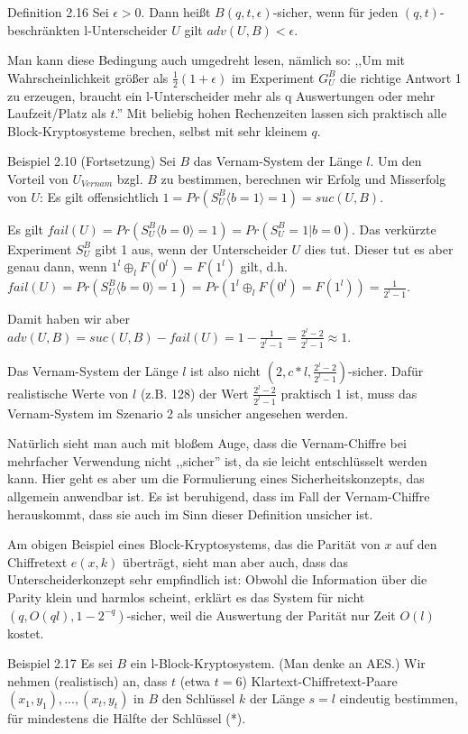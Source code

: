 \documentclass[a4paper]{article}
\begin{document}
\begin{multicols}{3}
    Definition 2.16 Sei $\epsilon>0$. Dann heißt $B(q,t,\epsilon)$-sicher, wenn für jeden $(q,t)$-beschränkten l-Unterscheider $U$ gilt $adv(U,B)< \epsilon$.

    Man kann diese Bedingung auch umgedreht lesen, nämlich so: ,,Um mit Wahrscheinlichkeit größer als $\frac{1}{2}(1 +\epsilon)$ im Experiment $G^B_U$ die richtige Antwort 1 zu erzeugen, braucht ein l-Unterscheider mehr als q Auswertungen oder mehr Laufzeit/Platz als $t$.''  Mit beliebig hohen Rechenzeiten lassen sich praktisch alle Block-Kryptosysteme brechen, selbst mit sehr kleinem $q$.

    Beispiel 2.10 (Fortsetzung) Sei $B$ das Vernam-System der Länge $l$. Um den Vorteil von $U_{Vernam}$ bzgl. $B$ zu bestimmen, berechnen wir Erfolg und Misserfolg von $U$: Es gilt offensichtlich $1=Pr(S^B_U\langle b= 1\rangle = 1) = suc(U,B)$.

    Es gilt $fail(U) = Pr(S^B_U\langle b= 0\rangle = 1) = Pr(S_U^B= 1|b= 0)$. Das verkürzte Experiment $S_U^B$ gibt 1 aus, wenn der Unterscheider $U$ dies tut. Dieser tut es aber genau dann, wenn $1^l\oplus_l F(0^l) =F(1^l)$ gilt, d.h. $fail(U) = Pr(S_U^B\langle b= 0\rangle = 1) = Pr(1^l\oplus_l F(0^l) =F(1^l)) = \frac{1}{2^l- 1}$.

    Damit haben wir aber $adv(U,B) = suc(U,B)-fail(U) = 1-\frac{1}{2^l- 1}=\frac{2^l-2}{2^l-1}\approx 1$.

    Das Vernam-System der Länge $l$ ist also nicht $(2,c*l,\frac{2^l- 2}{2^l- 1})$-sicher. Dafür realistische Werte von $l$ (z.B. 128) der Wert $\frac{2^l-2}{2^l-1}$ praktisch 1 ist, muss das Vernam-System im Szenario 2 als unsicher angesehen werden.

    Natürlich sieht man auch mit bloßem Auge, dass die Vernam-Chiffre bei mehrfacher Verwendung nicht ,,sicher'' ist, da sie leicht entschlüsselt werden kann. Hier geht es aber um die Formulierung eines Sicherheitskonzepts, das allgemein anwendbar ist. Es ist beruhigend, dass im Fall der Vernam-Chiffre herauskommt, dass sie auch im Sinn dieser Definition unsicher ist.

    Am obigen Beispiel eines Block-Kryptosystems, das die Parität von $x$ auf den Chiffretext $e(x,k)$ überträgt, sieht man aber auch, dass das Unterscheiderkonzept sehr empfindlich ist: Obwohl die Information über die Parity klein und harmlos scheint, erklärt es das System für nicht $(q,O(ql), 1-2^{-q})$-sicher, weil die Auswertung der Parität nur Zeit $O(l)$ kostet.

    Beispiel 2.17 Es sei $B$ ein l-Block-Kryptosystem. (Man denke an AES.) Wir nehmen (realistisch) an, dass $t$ (etwa $t=6$) Klartext-Chiffretext-Paare $(x_1,y_1),...,(x_t,y_t)$ in $B$ den Schlüssel $k$ der Länge $s=l$ eindeutig bestimmen, für mindestens die Hälfte der Schlüssel (*).


\end{multicols}
\end{document}
